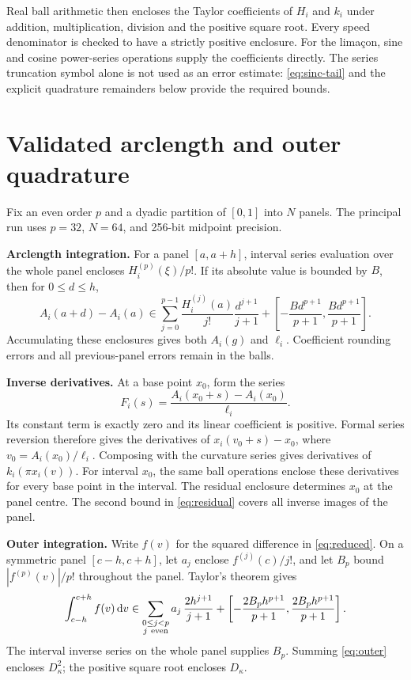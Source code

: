 \documentclass[10pt,a4paper]{article}
\newcommand{\dd}{\,\mathrm d}
\begin{document}
Real ball arithmetic then encloses the Taylor coefficients of \(H_i\) and \(k_i\)
under addition, multiplication, division and the positive square root.
Every speed denominator is checked to have a strictly positive enclosure.
For the lima\c{c}on, sine and cosine power-series operations supply the
coefficients directly.
The series truncation symbol alone is not used as an error estimate:
\eqref{eq:sinc-tail} and the explicit quadrature remainders below provide the
required bounds.

\section{Validated arclength and outer quadrature}
Fix an even order \(p\) and a dyadic partition of \([0,1]\) into \(N\) panels.
The principal run uses \(p=32\), \(N=64\), and 256-bit midpoint precision.

\textbf{Arclength integration.}
For a panel \([a,a+h]\), interval series evaluation over the whole panel encloses
\(H_i^{(p)}(\xi)/p!\). If its absolute value is bounded by \(B\), then for
\(0\leq d\leq h\),
\begin{equation}\label{eq:inner}
A_i(a+d)-A_i(a)
\in
\sum_{j=0}^{p-1}\frac{H_i^{(j)}(a)}{j!}\frac{d^{j+1}}{j+1}
+
\left[-\frac{B d^{p+1}}{p+1},\frac{B d^{p+1}}{p+1}\right].
\end{equation}
Accumulating these enclosures gives both \(A_i(g)\) and \(\ell_i\).
Coefficient rounding errors and all previous-panel errors remain in the balls.

\textbf{Inverse derivatives.}
At a base point \(x_0\), form the series
\[
F_i(s)=\frac{A_i(x_0+s)-A_i(x_0)}{\ell_i}.
\]
Its constant term is exactly zero and its linear coefficient is positive.
Formal series reversion therefore gives the derivatives of
\(x_i(v_0+s)-x_0\), where \(v_0=A_i(x_0)/\ell_i\).
Composing with the curvature series gives derivatives of
\(k_i(\pi x_i(v))\).
For interval \(x_0\), the same ball operations enclose these derivatives for
every base point in the interval.
The residual enclosure determines \(x_0\) at the panel centre.
The second bound in \eqref{eq:residual} covers all inverse images of the panel.

\textbf{Outer integration.}
Write \(f(v)\) for the squared difference in \eqref{eq:reduced}.
On a symmetric panel \([c-h,c+h]\), let \(a_j\) enclose \(f^{(j)}(c)/j!\),
and let \(B_p\) bound \(|f^{(p)}(v)|/p!\) throughout the panel.
Taylor's theorem gives
\begin{equation}\label{eq:outer}
\int_{c-h}^{c+h}f(v)\dd v
\in
\sum_{\substack{0\leq j<p\\j\ {\rm even}}}
  a_j\,\frac{2h^{j+1}}{j+1}
+
\left[-\frac{2B_p h^{p+1}}{p+1},
       \frac{2B_p h^{p+1}}{p+1}\right].
\end{equation}
The interval inverse series on the whole panel supplies \(B_p\).
Summing \eqref{eq:outer} encloses \(D_\kappa^2\); the positive square root
encloses \(D_\kappa\).
\end{document}
